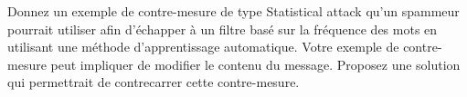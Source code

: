 \begin{homeworkProblem}
\begin{homeworkSection}{3.3}
			\problemAnswer{
			
			}
					
		\end{homeworkSection}
		
		\begin{homeworkSection}{3.4}

			Donnez un exemple de contre-mesure de type Statistical attack qu’un spammeur
			pourrait utiliser afin d’échapper à un filtre basé sur la fréquence des mots en utilisant une
			méthode d’apprentissage automatique. Votre exemple de contre-mesure peut impliquer de
			modifier le contenu du message. Proposez une solution qui permettrait de contrecarrer
			cette contre-mesure.

			\problemAnswer{
			
			}
					
		\end{homeworkSection}
		
			
	\end{homeworkProblem}